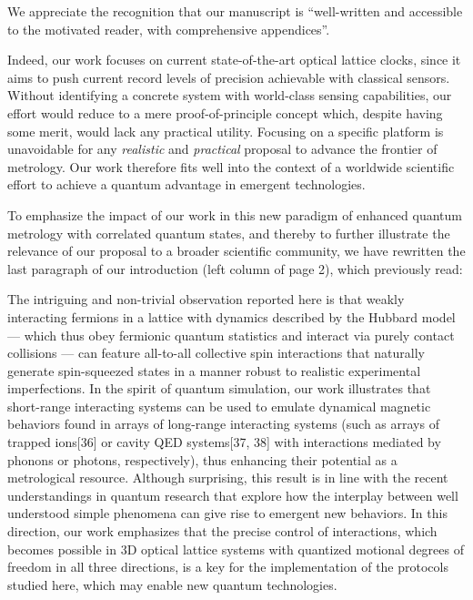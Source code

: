 \documentclass[preprint,superscriptaddress]{revtex4-2}
\newcommand{\red}[1]{{\color{red} #1}}
\begin{document}
\begin{enumerate}
  We appreciate the recognition that our manuscript is ``well-written
  and accessible to the motivated reader, with comprehensive
  appendices''.

  Indeed, our work focuses on current state-of-the-art optical lattice
  clocks, since it aims to push current record levels of precision
  achievable with classical sensors.  Without identifying a concrete
  system with world-class sensing capabilities, our effort would
  reduce to a mere proof-of-principle concept which, despite having
  some merit, would lack any practical utility.  Focusing on a
  specific platform is unavoidable for any {\it realistic} and {\it
    practical} proposal to advance the frontier of metrology.  Our
  work therefore fits well into the context of a worldwide scientific
  effort to achieve a quantum advantage in emergent technologies.

  To emphasize the impact of our work in this new paradigm of enhanced
  quantum metrology with correlated quantum states, and thereby to
  further illustrate the relevance of our proposal to a broader
  scientific community, we have rewritten the last paragraph of our
  introduction (left column of page 2), which previously read:

  \red{The intriguing and non-trivial observation reported here is
    that weakly interacting fermions in a lattice with dynamics
    described by the Hubbard model --- which thus obey fermionic
    quantum statistics and interact via purely contact collisions ---
    can feature all-to-all collective spin interactions that naturally
    generate spin-squeezed states in a manner robust to realistic
    experimental imperfections. In the spirit of quantum simulation,
    our work illustrates that short-range interacting systems can be
    used to emulate dynamical magnetic behaviors found in arrays of
    long-range interacting systems (such as arrays of trapped ions[36]
    or cavity QED systems[37, 38] with interactions mediated by
    phonons or photons, respectively), thus enhancing their potential
    as a metrological resource. Although surprising, this result is in
    line with the recent understandings in quantum research that
    explore how the interplay between well understood simple phenomena
    can give rise to emergent new behaviors. In this direction, our
    work emphasizes that the precise control of interactions, which
    becomes possible in 3D optical lattice systems with quantized
    motional degrees of freedom in all three directions, is a key for
    the implementation of the protocols studied here, which may enable
    new quantum technologies.}


\end{enumerate}
\end{document}

